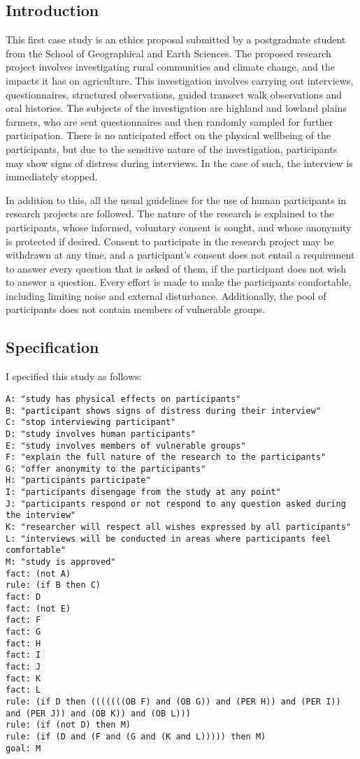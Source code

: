 \documentclass{l4proj}
\begin{document}
\subsection{Introduction}
This first case study is an ethics proposal submitted by a postgraduate student from the School of Geographical and Earth Sciences. The proposed research project involves investigating rural communities and climate change, and the impacts it has on agriculture. This investigation involves carrying out interviews, questionnaires, structured observations, guided transect walk observations and oral histories. The subjects of the investigation are highland and lowland plains farmers, who are sent questionnaires and then randomly sampled for further participation. There is no anticipated effect on the physical wellbeing of the participants, but due to the sensitive nature of the investigation, participants may show signs of distress during interviews. In the case of such, the interview is immediately stopped. 

In addition to this, all the usual guidelines for the use of human participants in research projects are followed. The nature of the research is explained to the participants, whose informed, voluntary consent is sought, and whose anonymity is protected if desired. Consent to participate in the research project may be withdrawn at any time, and a participant's consent does not entail a requirement to answer every question that is asked of them, if the participant does not wish to answer a question. Every effort is made to make the participants comfortable, including limiting noise and external disturbance. Additionally, the pool of participants does not contain members of vulnerable groups. 

\subsection{Specification}

I specified this study as follows: 
\begin{verbatim}
A: "study has physical effects on participants"
B: "participant shows signs of distress during their interview"
C: "stop interviewing participant"
D: "study involves human participants"
E: "study involves members of vulnerable groups"
F: "explain the full nature of the research to the participants"
G: "offer anonymity to the participants"
H: "participants participate"
I: "participants disengage from the study at any point"
J: "participants respond or not respond to any question asked during the interview"
K: "researcher will respect all wishes expressed by all participants"
L: "interviews will be conducted in areas where participants feel comfortable"
M: "study is approved"
fact: (not A)
rule: (if B then C)
fact: D
fact: (not E)
fact: F
fact: G
fact: H
fact: I
fact: J 
fact: K
fact: L
rule: (if D then (((((((OB F) and (OB G)) and (PER H)) and (PER I)) and (PER J)) and (OB K)) and (OB L)))
rule: (if (not D) then M)
rule: (if (D and (F and (G and (K and L))))) then M)
goal: M
\end{verbatim}
\end{document}
